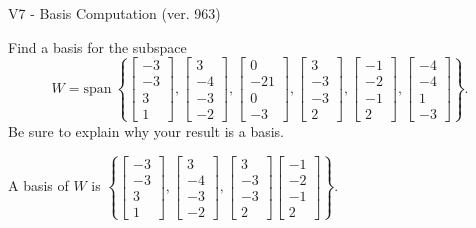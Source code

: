 \begin{exercise}
  \begin{exerciseTitle}V7 - Basis Computation (ver. 963)\end{exerciseTitle}
  \begin{exerciseStatement}
    Find a basis for the subspace 
\[W=\mathrm{span}\ \left\{\left[\begin{array}{r}
-3 \\
-3 \\
3 \\
1
\end{array}\right] , \left[\begin{array}{r}
3 \\
-4 \\
-3 \\
-2
\end{array}\right] , \left[\begin{array}{r}
0 \\
-21 \\
0 \\
-3
\end{array}\right] , \left[\begin{array}{r}
3 \\
-3 \\
-3 \\
2
\end{array}\right] , \left[\begin{array}{r}
-1 \\
-2 \\
-1 \\
2
\end{array}\right] , \left[\begin{array}{r}
-4 \\
-4 \\
1 \\
-3
\end{array}\right]\right\}.\]
 Be sure to explain why your result is a basis.


  \end{exerciseStatement}
  \begin{exerciseAnswer}
   A basis of \(W\) is  \(\left\{\left[\begin{array}{r}
-3 \\
-3 \\
3 \\
1
\end{array}\right] , \left[\begin{array}{r}
3 \\
-4 \\
-3 \\
-2
\end{array}\right] , \left[\begin{array}{r}
3 \\
-3 \\
-3 \\
2
\end{array}\right] \left[\begin{array}{r}
-1 \\
-2 \\
-1 \\
2
\end{array}\right]\right\}\).
  


  \end{exerciseAnswer}
\end{exercise}